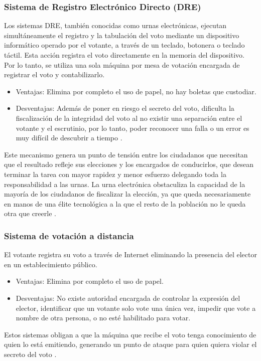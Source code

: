 \subsubsection{Sistema de Registro Electrónico Directo (DRE)}
Los sistemas DRE, también conocidas como urnas electrónicas, ejecutan simultáneamente el registro y la tabulación del voto mediante un dispositivo informático operado por el votante, a través de un teclado, botonera o teclado táctil. Esta acción registra el voto directamente en la memoria del dispositivo. Por lo tanto, se utiliza una sola máquina por mesa de votación encargada de registrar el voto y contabilizarlo. 
\begin{itemize}
    \item Ventajas: Elimina por completo el uso de papel, no hay boletas que custodiar.
    \item Desventajas: Además de poner en riesgo el secreto del voto, dificulta la fiscalización de la integridad del voto al no existir una separación entre el votante y el escrutinio, por lo tanto, poder reconocer una falla o un error es muy difícil de descubrir a tiempo \cite{DRE-Fallas}. 
\end{itemize}
Este mecanismo genera un punto de tensión entre los ciudadanos que necesitan que el resultado refleje sus elecciones y los encargados de conducirlos, que desean terminar la tarea con mayor rapidez y menor esfuerzo delegando toda la responsabilidad a las urnas. La urna electrónica obstaculiza la capacidad de la mayoría de los ciudadanos de fiscalizar la elección, ya que queda necesariamente en manos de una élite tecnológica a la que el resto de la población no le queda otra que creerle \cite{libroVoto}.

\subsubsection{Sistema de votación a distancia}
El votante registra su voto a través de Internet eliminando la presencia del elector en un establecimiento público. 

\begin{itemize}
    \item Ventajas: Elimina por completo el uso de papel.
    \item Desventajas: No existe autoridad encargada de controlar la expresión del elector, identificar que un votante solo vote una única vez, impedir que vote a nombre de otra persona, o no esté habilitado para votar. 
\end{itemize}
Estos sistemas obligan a que la máquina que recibe el voto tenga conocimiento de quien lo está emitiendo, generando un punto de ataque para quien quiera violar el secreto del voto \cite{valdes2010voto}.

